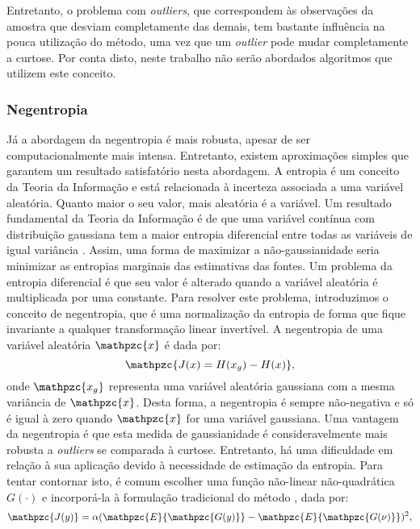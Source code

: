     \bigskip

    Entretanto, o problema com \textit{outliers}, que correspondem às observações da amostra que desviam completamente das demais, tem bastante influência na pouca utilização do método, uma vez que um \textit{outlier} pode mudar completamente a curtose. Por conta disto, neste trabalho não serão abordados algoritmos que utilizem este conceito.
    
\subsubsection{Negentropia} \label{sec:negentropy}

    Já a abordagem da negentropia é mais robusta, apesar de ser computacionalmente mais intensa. Entretanto, existem aproximações simples que garantem um resultado satisfatório nesta abordagem. A entropia é um conceito da Teoria da Informação e está relacionada à incerteza associada a uma variável aleatória. Quanto maior o seu valor, mais aleatória é a variável. Um resultado fundamental da Teoria da Informação é de que uma variável contínua com distribuição gaussiana tem a maior entropia diferencial entre todas as variáveis de igual variância \cite{entropy}. Assim, uma forma de maximizar a não-gaussianidade seria minimizar as entropias marginais das estimativas das fontes. Um problema da entropia diferencial é que seu valor é alterado quando a variável aleatória é multiplicada por uma constante. Para resolver este problema, introduzimos o conceito de negentropia, que é uma normalização da entropia de forma que fique invariante a qualquer transformação linear invertível. A negentropia de uma variável aleatória $\mathpzc{x}$ é dada por:
    \begin{equation}
        \mathpzc{J(x) = H(x_g) - H(x)},
    \end{equation}
    onde $\mathpzc{x_g}$ representa uma variável aleatória gaussiana com a mesma variância de $\mathpzc{x}$. Desta forma, a negentropia é sempre não-negativa e só é igual à zero quando $\mathpzc{x}$ for uma variável gaussiana. Uma vantagem da negentropia é que esta medida de gaussianidade é consideravelmente mais robusta a \textit{outliers} se comparada à curtose.
    Entretanto, há uma dificuldade em relação à sua aplicação devido à necessidade de estimação da entropia. Para tentar contornar isto, é comum escolher uma função não-linear não-quadrática $G(\cdot)$ e incorporá-la à formulação tradicional do método \cite{fastica1}, dada por:
    \begin{equation}
        \mathpzc{J(y)} = \alpha(\mathpzc{E}\{\mathpzc{G(y)}\} - \mathpzc{E}\{\mathpzc{G(\nu)}\})^2,
    \end{equation}
